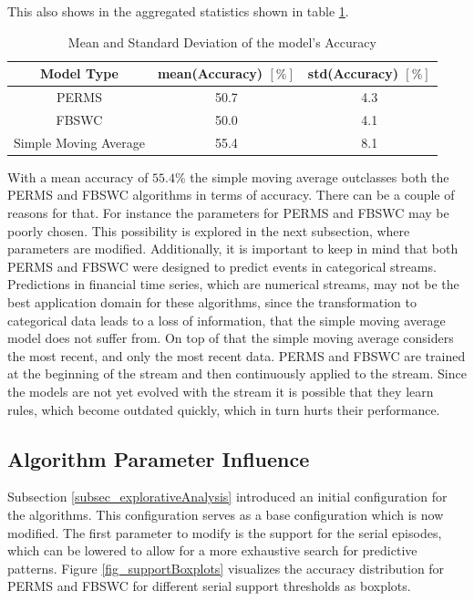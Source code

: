 This also shows in the aggregated statistics shown in table \ref{table_baselineAccuracy}. 

\begin{table}
\vspace{0.5cm}	
\caption[Model and Baseline Performance (Accuracy)]{Mean and Standard Deviation of the model's Accuracy\label{table_baselineAccuracy}}
\centering
\begin{tabular}{ c | c | c}		
  Model Type & mean(Accuracy) $[\%]$ & std(Accuracy) $[\%]$\\
  \hline
  PERMS & 50.7 & 4.3\\
  FBSWC & 50.0 & 4.1\\
  Simple Moving Average & 55.4 & 8.1\\
\end{tabular}
\vspace{0.5cm}
\end{table}

With a mean accuracy of $55.4\%$ the simple moving average outclasses both the PERMS and FBSWC algorithms in terms of accuracy. There can be a couple of reasons for that. For instance the parameters for PERMS and FBSWC may be poorly chosen. This possibility is explored in the next subsection, where parameters are modified. Additionally, it is important to keep in mind that both PERMS and FBSWC were designed to predict events in categorical streams. Predictions in financial time series, which are numerical streams, may not be the best application domain for these algorithms, since the transformation to categorical data leads to a loss of information, that the simple moving average model does not suffer from. On top of that the simple moving average considers the most recent, and only the most recent data. PERMS and FBSWC are trained at the beginning of the stream and then continuously applied to the stream. Since the models are not yet evolved with the stream it is possible that they learn rules, which become outdated quickly, which in turn hurts their performance.


\subsection{Algorithm Parameter Influence}
Subsection \ref{subsec_explorativeAnalysis} introduced an initial configuration for the algorithms. This configuration serves as a base configuration which is now modified. The first parameter to modify is the support for the serial episodes, which can be lowered to allow for a more exhaustive search for predictive patterns. Figure \ref{fig_supportBoxplots} visualizes the accuracy distribution for PERMS and FBSWC for different serial support thresholds as boxplots.

